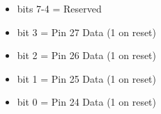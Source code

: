 \begin{itemize}
\item bits 7-4 = Reserved
\item bit 3 = Pin 27 Data (1 on reset)
\item bit 2 = Pin 26 Data (1 on reset)
\item bit 1 = Pin 25 Data (1 on reset)
\item bit 0 = Pin 24 Data (1 on reset)
\end{itemize}

